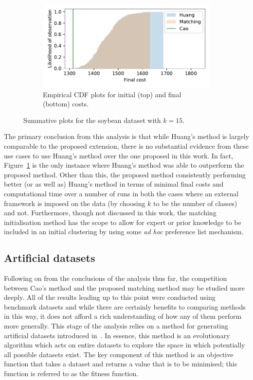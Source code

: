 \documentclass[11pt]{article}
\begin{document}
\begin{figure}
\begin{subfigure}{.5\textwidth}
        \includegraphics[width=\linewidth]{Fig8b2.pdf}
        \caption{Empirical CDF plots for initial (top) and final (bottom)
                 costs.}
    \end{subfigure}
    \caption{Summative plots for the soybean dataset with \(k=15\).}%
    \label{fig:soybean_nclasses}
\end{figure}

The primary conclusion from this analysis is that while Huang's method is
largely comparable to the proposed extension, there is no substantial evidence
from these use cases to use Huang's method over the one proposed in this work.
In fact, Figure~\ref{fig:soybean_nclasses} is the only instance where Huang's
method was able to outperform the proposed method. Other than this, the proposed
method consistently performing better (or as well as) Huang's method in terms of
minimal final costs and computational time over a number of runs in both the
cases where an external framework is imposed on the data (by choosing \(k\) to
be the number of classes) and not. Furthermore, though not discussed in this
work, the matching initialisation method has the scope to allow for expert or
prior knowledge to be included in an initial clustering by using some \textit{ad
hoc} preference list mechanism.


\subsection{Artificial datasets}\label{subsec:artificial}

Following on from the conclusions of the analysis thus far, the competition
between Cao's method and the proposed matching method may be studied more
deeply. All of the results leading up to this point were conducted using
benchmark datasets and while there are certainly benefits to comparing methods
in this way, it does not afford a rich understanding of how any of them perform
more generally. This stage of the analysis relies on a method for generating
artificial datasets introduced in~\cite{Wilde2019}. In essence, this method is
an evolutionary algorithm which acts on entire datasets to explore the space in
which potentially all possible datasets exist. The key component of this method
is an objective function that takes a dataset and returns a value that is to be
minimised; this function is referred to as the fitness function.
\end{document}
